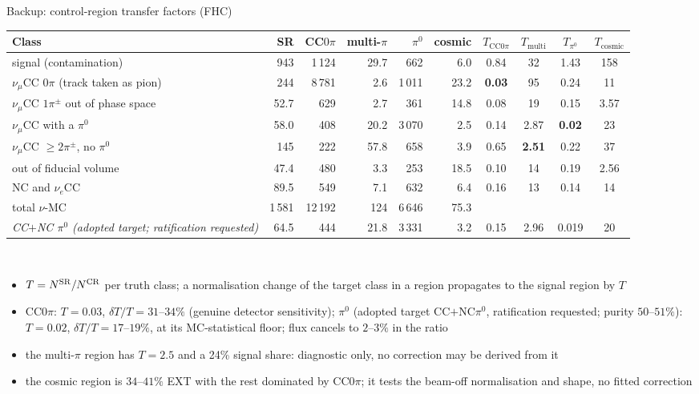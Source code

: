 \documentclass[aspectratio=169,10pt]{beamer}
\begin{document}
\begin{frame}{Backup: control-region transfer factors (FHC)}
  \scriptsize\setlength{\tabcolsep}{3.5pt}
  \begin{tabular}{lrrrrrcccc}
    \toprule
    Class & SR & CC$0\pi$ & multi-$\pi$ & $\pi^0$ & cosmic & $T_{\mathrm{CC}0\pi}$ & $T_{\mathrm{multi}}$ & $T_{\pi^0}$ & $T_{\mathrm{cosmic}}$ \\
    \midrule
    signal (contamination) & 943 & 1\,124 & 29.7 & 662 & 6.0 & 0.84 & 32 & 1.43 & 158 \\
    $\nu_\mu$CC $0\pi$ (track taken as pion) & 244 & 8\,781 & 2.6 & 1\,011 & 23.2 & \textbf{0.03} & 95 & 0.24 & 11 \\
    $\nu_\mu$CC $1\pi^\pm$ out of phase space & 52.7 & 629 & 2.7 & 361 & 14.8 & 0.08 & 19 & 0.15 & 3.57 \\
    $\nu_\mu$CC with a $\pi^0$ & 58.0 & 408 & 20.2 & 3\,070 & 2.5 & 0.14 & 2.87 & \textbf{0.02} & 23 \\
    $\nu_\mu$CC $\geq2\pi^\pm$, no $\pi^0$ & 145 & 222 & 57.8 & 658 & 3.9 & 0.65 & \textbf{2.51} & 0.22 & 37 \\
    out of fiducial volume & 47.4 & 480 & 3.3 & 253 & 18.5 & 0.10 & 14 & 0.19 & 2.56 \\
    NC and $\nu_e$CC & 89.5 & 549 & 7.1 & 632 & 6.4 & 0.16 & 13 & 0.14 & 14 \\
    total $\nu$-MC & 1\,581 & 12\,192 & 124 & 6\,646 & 75.3 & & & & \\
    \emph{CC$+$NC $\pi^0$ (adopted target; ratification requested)} & 64.5 & 444 & 21.8 & 3\,331 & 3.2 & 0.15 & 2.96 & 0.019 & 20 \\
    \bottomrule
  \end{tabular}\\[3pt]
  \footnotesize
  \begin{itemize}\itemsep1pt
    \item $T=N^{\rm SR}/N^{\rm CR}$ per truth class; a normalisation change of the target class in a region propagates to the signal region by $T$
    \item CC$0\pi$: $T=0.03$, $\delta T/T=31$--$34\%$ (genuine detector sensitivity); $\pi^0$ (adopted target CC$+$NC$\pi^0$, ratification requested; purity $50$--$51\%$): $T=0.02$, $\delta T/T=17$--$19\%$, at its MC-statistical floor; flux cancels to $2$--$3\%$ in the ratio
    \item the multi-$\pi$ region has $T=2.5$ and a 24\% signal share: diagnostic only, no correction may be derived from it
    \item the cosmic region is $34$--$41\%$ EXT with the rest dominated by CC$0\pi$; it tests the beam-off normalisation and shape, no fitted correction
  \end{itemize}
\end{frame}
\end{document}
